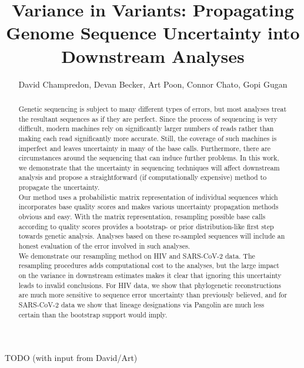 \documentclass[
]{article}
\title{Variance in Variants: Propagating Genome Sequence Uncertainty
into Downstream Analyses}
\author{David Champredon, Devan Becker, Art Poon, Connor Chato, Gopi
Gugan}
\date{}
\begin{document}
\maketitle
\begin{abstract}
Genetic sequencing is subject to many different types of errors, but
most analyses treat the resultant sequences as if they are perfect.
Since the process of sequencing is very difficult, modern machines rely
on significantly larger numbers of reads rather than making each read
significantly more accurate. Still, the coverage of such machines is
imperfect and leaves uncertainty in many of the base calls. Furthermore,
there are circumstances around the sequencing that can induce further
problems. In this work, we demonstrate that the uncertainty in
sequencing techniques will affect downstream analysis and propose a
straightforward (if computationally expensive) method to propagate the
uncertainty.\\
Our method uses a probabilistic matrix representation of individual
sequences which incorporates base quality scores and makes various
uncertainty propagation methods obvious and easy. With the matrix
representation, resampling possible base calls according to quality
scores provides a bootstrap- or prior distribution-like first step
towards genetic analysis. Analyses based on these re-sampled sequences
will include an honest evaluation of the error involved in such
analyses.\\
We demonstrate our resampling method on HIV and SARS-CoV-2 data. The
resampling procedures adds computational cost to the analyses, but the
large impact on the variance in downstream estimates makes it clear that
ignoring this uncertainty leads to invalid conclusions. For HIV data, we
show that phylogenetic reconstructions are much more sensitive to
sequence error uncertainty than previously believed, and for SARS-CoV-2
data we show that lineage designations via Pangolin are much less
certain than the bootstrap support would imply.
\end{abstract}

TODO (with input from David/Art)
\end{document}
